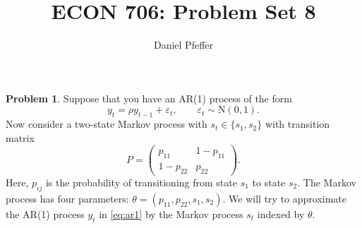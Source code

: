 \documentclass[oneside,reqno]{amsart}
\title{ECON 706: Problem Set 8}
\author{Daniel Pfeffer}
\newcommand{\eps}{\varepsilon}
\newcommand{\N}{\mathrm N}
\theoremstyle{definition}
\newtheorem{prob}{Problem}
\begin{document}
\maketitle

\begin{prob}
Suppose that you have an AR(1) process of the form 
\begin{equation}\label{eq:ar1}
	y_t = \rho y_{t-1} + \eps_t,
	\qquad \eps_t \sim \N(0,1).
\end{equation}
Now consider a two-state Markov process with $s_t \in \{s_1, s_2\}$ with transition matrix
\begin{equation}\label{eq:P}
	P = \begin{pmatrix}
		p_{11} & 1-p_{11} \\
		1- p_{22} & p_{22}
	\end{pmatrix}.
\end{equation}
Here, $p_{ij}$ is the probability of transitioning from state $s_1$ to state $s_2$. The Markov process has four parameters: $\theta = (p_{11}, p_{22}, s_1, s_2)$. We will try to approximate the AR(1) process $y_t$ in \eqref{eq:ar1} by the Markov process $s_t$ indexed by $\theta$.
\end{prob}
\end{document}
